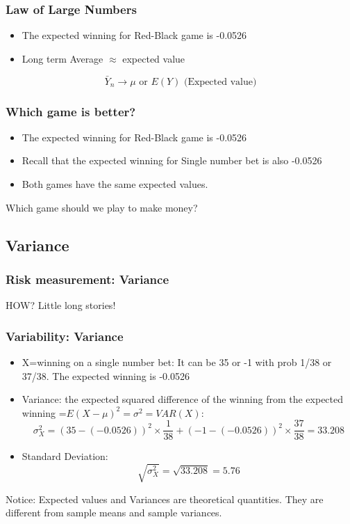 \documentclass[
  ignorenonframetext,
]{beamer}
\begin{document}
\begin{frame}
\frametitle{Law of Large Numbers}

\begin{itemize}
\item
  The expected winning for Red-Black game is -0.0526
\item
  Long term Average \(\approx\) expected value
\end{itemize}

\[\bar{Y}_{n} \rightarrow \mu \mbox{ or } E(Y) \mbox{ (Expected value)}\]
\end{frame}

\begin{frame}
\frametitle{Which game is better?}

\begin{itemize}
\item
  The expected winning for Red-Black game is -0.0526
\item
  Recall that the expected winning for Single number bet is also -0.0526
\item
  Both games have the same expected values.
\end{itemize}

\begin{center}
Which game should we play to make money?
\end{center}
\end{frame}

\hypertarget{variance}{%
\subsection{Variance}\label{variance}}

\begin{frame}
\frametitle{Risk measurement: Variance}

\Large
\begin{center}
HOW?
Little long stories!
\end{center}
\end{frame}

\begin{frame}
\frametitle{Variability: Variance}

\begin{itemize}
\item
  X=winning on a single number bet: It can be 35 or -1 with prob 1/38 or
  37/38. The expected winning is -0.0526
\item
  Variance: the expected squared difference of the winning from the
  expected winning =\(E(X -\mu)^2=\sigma^2=VAR(X)\):
  \[\scriptstyle {\sigma_X^2 = (35 -(- 0.0526))^2 \times \frac{1}{38} +  (- 1 -(- 0.0526))^2  \times \frac{37}{38} = 33.208} \]
\item
  Standard Deviation:
  \[\scriptstyle \sqrt{\sigma_X^2}  = \sqrt{33.208} = 5.76 \]
\end{itemize}

Notice: Expected values and Variances are theoretical quantities. They
are different from sample means and sample variances.
\end{frame}
\end{document}
